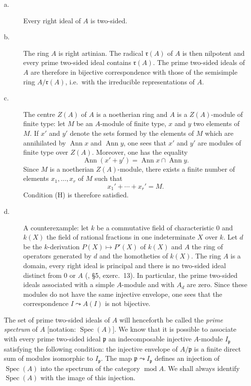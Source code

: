 \begin{description}
\item[\normalfont a.] Every right ideal of $A$ is two-sided.
\item[\normalfont b.] The ring $A$ is right artinian. The radical
  $\mathfrak{r}(A)$ of $A$ is then nilpotent and every prime two-sided
  ideal contains $\mathfrak{r}(A)$. The prime two-sided ideals of $A$
  are therefore in bijective correspondence with those of the
  semisimple ring $A/\mathfrak{r}(A)$, i.e.\ with the irreducible
  representations of $A$.
\item[\normalfont c.] The centre $Z(A)$ of $A$ is a noetherian ring and
  $A$ is a $Z(A)$-module of finite type: let $M$ be an $A$-module of
  finite type, $x$ and $y$ two elements of $M$. If $x'$ and $y'$ denote
  the sets formed by the elements of $M$ which are annihilated by
  $\operatorname{Ann} x$ and $\operatorname{Ann} y$, one sees that $x'$
  and $y'$ are modules of finite type over $Z(A)$. Moreover, one has
  the equality
  \[
  \operatorname{Ann}(x' + y') = \operatorname{Ann} x \cap \operatorname{Ann} y.
  \]
  Since $M$ is a noetherian $Z(A)$-module, there exists a finite number
  of elements $x_1, \ldots, x_r$ of $M$ such that
  \[
  x_1' + \cdots + x_r' = M.
  \]
  Condition (H) is therefore satisfied.
\item[\normalfont d.] A counterexample: let $k$ be a commutative field
  of characteristic $0$ and $k(X)$ the field of rational fractions in
  one indeterminate $X$ over $k$. Let $d$ be the $k$-derivation
  $P(X) \mapsto P'(X)$ of $k(X)$ and $A$ the ring of operators generated
  by $d$ and the homotheties of $k(X)$. The ring $A$ is a domain, every
  right ideal is principal and there is no two-sided ideal distinct from
  $0$ or $A$ (\cite{bourbaki-algebre}, \S5, exerc.~13). In particular,
  the prime two-sided ideals associated with a simple $A$-module and
  with $A_d$ are zero. Since these modules do not have the same
  injective envelope, one sees that the correspondence
  $I \leadsto A(I)$ is not bijective.
\end{description}

The set of prime two-sided ideals of $A$ will henceforth be called the
\emph{prime spectrum} of $A$ [notation: $\operatorname{Spec}(A)$]. We
know that it is possible to associate with every prime two-sided ideal
$\mathfrak{p}$ an indecomposable injective $A$-module $I_{\mathfrak{p}}$
satisfying the following condition: the injective envelope of
$A/\mathfrak{p}$ is a finite direct sum of modules isomorphic to
$I_{\mathfrak{p}}$. The map $\mathfrak{p} \leadsto I_{\mathfrak{p}}$
defines an injection of $\operatorname{Spec}(A)$ into the spectrum of
the category $\operatorname{mod} A$. We shall always identify
$\operatorname{Spec}(A)$ with the image of this injection.


